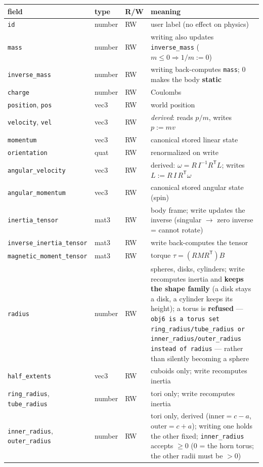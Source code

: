 \documentclass[11pt]{article}
\newcommand{\code}[1]{\texttt{#1}}
\begin{document}
\begin{longtable}{lllp{6.4cm}}
\textbf{field} & \textbf{type} & \textbf{R/W} & \textbf{meaning}\\\hline
\code{id} & number & RW & user label (no effect on physics)\\
\code{mass} & number & RW & writing also updates \code{inverse\_mass} ($m\le 0 \Rightarrow 1/m := 0$)\\
\code{inverse\_mass} & number & RW & writing back-computes \code{mass}; $0$ makes the body \textbf{static}\\
\code{charge} & number & RW & Coulombs\\
\code{position}, \code{pos} & vec3 & RW & world position\\
\code{velocity}, \code{vel} & vec3 & RW & \emph{derived}: reads $p/m$, writes $p := m v$\\
\code{momentum} & vec3 & RW & canonical stored linear state\\
\code{orientation} & quat & RW & renormalized on write\\
\code{angular\_velocity} & vec3 & RW & derived: $\omega = R\,I^{-1}R^{\mathsf T}L$; writes $L := R\,I\,R^{\mathsf T}\omega$\\
\code{angular\_momentum} & vec3 & RW & canonical stored angular state (spin)\\
\code{inertia\_tensor} & mat3 & RW & body frame; write updates the inverse (singular $\to$ zero inverse = cannot rotate)\\
\code{inverse\_inertia\_tensor} & mat3 & RW & write back-computes the tensor\\
\code{magnetic\_moment\_tensor} & mat3 & RW & torque $\tau = (R M R^{\mathsf T})B$\\
\code{radius} & number & RW & spheres, disks, cylinders; write recomputes inertia and \textbf{keeps the shape family} (a disk stays a disk, a cylinder keeps its height); a torus is \textbf{refused} --- \code{obj6 is a torus \textemdash{} set ring\_radius/tube\_radius or inner\_radius/outer\_radius instead of radius} --- rather than silently becoming a sphere\\
\code{half\_extents} & vec3 & RW & cuboids only; write recomputes inertia\\
\code{ring\_radius}, \code{tube\_radius} & number & RW & tori only; write recomputes inertia\\
\code{inner\_radius}, \code{outer\_radius} & number & RW & tori only, derived ($\mathrm{inner} = c-a$, $\mathrm{outer} = c+a$); writing one holds the other fixed; \code{inner\_radius} accepts $\ge 0$ (0 = the horn torus; the other radii must be $> 0$)\\

\end{longtable}
\end{document}
